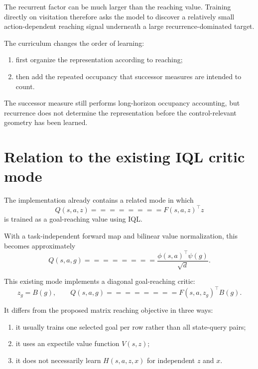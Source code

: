 \documentclass[10pt]{article}
\begin{document}
The recurrent factor can be much larger than the reaching value.
Training directly on visitation therefore asks the model to discover a relatively small
action-dependent reaching signal underneath a large recurrence-dominated target.

The curriculum changes the order of learning:
\begin{enumerate}
\item first organize the representation according to reaching;
\item then add the repeated occupancy that successor measures are intended to count.
\end{enumerate}

The successor measure still performs long-horizon occupancy accounting, but recurrence
does not determine the representation before the control-relevant geometry has been
learned.

\section{Relation to the existing IQL critic mode}

The implementation already contains a related mode in which
\begin{equation}
Q(s,a,z)
========

F(s,a,z)^\top z
\end{equation}
is trained as a goal-reaching value using IQL.

With a task-independent forward map and bilinear value normalization, this becomes
approximately
\begin{equation}
Q(s,a,g)
========

\frac{
\phi(s,a)^\top\psi(g)
}{
\sqrt{d}
}.
\end{equation}

This existing mode implements a diagonal goal-reaching critic:
\begin{equation}
z_g=B(g),
\qquad
Q(s,a,g)
========

F(s,a,z_g)^\top B(g).
\end{equation}

It differs from the proposed matrix reaching objective in three ways:
\begin{enumerate}
\item it usually trains one selected goal per row rather than all state-query pairs;
\item it uses an expectile value function $V(s,z)$;
\item it does not necessarily learn $H(s,a,z,x)$ for independent $z$ and $x$.
\end{enumerate}
\end{document}
